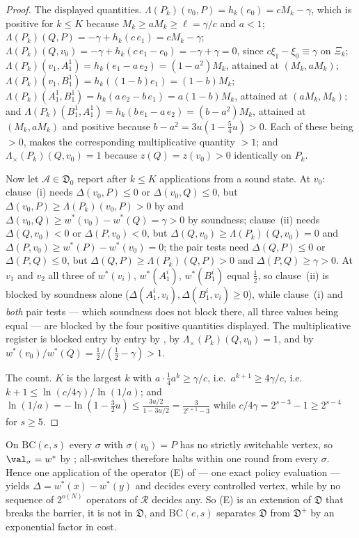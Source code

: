 \begin{proof}
The displayed quantities. $\Lambda(P_k)(v_0,P)=h_k(e_0)=cM_k-\gamma$,
which is positive for $k\le K$ because $M_k\ge aM_k\ge\ell=\gamma/c$ and
$a<1$; $\Lambda(P_k)(Q,P)=-\gamma+h_k(c\,e_1)=cM_k-\gamma$;
$\Lambda(P_k)(Q,v_0)=-\gamma+h_k(c\,e_1-e_0)=-\gamma+\gamma=0$, since
$c\xi_1-\xi_0\equiv\gamma$ on $\Xi_k$;
$\Lambda(P_k)(v_1,A^{1}_1)=h_k(e_1-a\,e_2)=(1-a^{2})M_k$, attained at
$(M_k,aM_k)$; $\Lambda(P_k)(v_1,B^{1}_1)=h_k((1-b)e_1)=(1-b)M_k$;
$\Lambda(P_k)(A^{1}_1,B^{1}_1)=h_k(a\,e_2-b\,e_1)=a(1-b)M_k$, attained at
$(aM_k,M_k)$; and $\Lambda(P_k)(B^{1}_1,A^{1}_1)=h_k(b\,e_1-a\,e_2)
=(b-a^{2})M_k$, attained at $(M_k,aM_k)$ and positive because
$b-a^{2}=3u(1-\tfrac54u)>0$. Each of these being $>0$, 
makes the corresponding multiplicative quantity $>1$; and
$\Lambda_\times(P_k)(Q,v_0)=1$ because $z(Q)=z(v_0)>0$ identically on
$P_k$.

Now let $\mathcal A\in\mathfrak D_0$ report after $k\le K$ applications
from a sound state. At $v_0$: clause~(i) needs $\Delta(v_0,P)\le0$ or
$\Delta(v_0,Q)\le0$, but $\Delta(v_0,P)\ge\Lambda(P_k)(v_0,P)>0$ by
 and $\Delta(v_0,Q)\ge w^\ast(v_0)-w^\ast(Q)=\gamma>0$
by soundness; clause~(ii) needs $\Delta(Q,v_0)<0$ or $\Delta(P,v_0)<0$,
but $\Delta(Q,v_0)\ge\Lambda(P_k)(Q,v_0)=0$ and
$\Delta(P,v_0)\ge w^\ast(P)-w^\ast(v_0)=0$; the pair tests need
$\Delta(Q,P)\le0$ or $\Delta(P,Q)\le0$, but
$\Delta(Q,P)\ge\Lambda(P_k)(Q,P)>0$ and $\Delta(P,Q)\ge\gamma>0$. At
$v_1$ and $v_2$ all three of $w^\ast(v_i)$, $w^\ast(A^{i}_1)$,
$w^\ast(B^{i}_1)$ equal $\tfrac12$, so clause~(ii) is blocked by soundness
alone ($\Delta(A^{i}_1,v_i),\Delta(B^{i}_1,v_i)\ge0$), while clause~(i)
and \emph{both} pair tests --- which soundness does not block there, all
three values being equal --- are blocked by the four positive quantities
displayed. The multiplicative register is blocked entry by entry by
, by $\Lambda_\times(P_k)(Q,v_0)=1$, and by
$w^\ast(v_0)/w^\ast(Q)=\tfrac12/(\tfrac12-\gamma)>1$.

The count. $K$ is the largest $k$ with $a\cdot\tfrac14a^{k}\ge\gamma/c$,
i.e.\ $a^{k+1}\ge4\gamma/c$, i.e.\ $k+1\le\ln(c/4\gamma)/\ln(1/a)$; and
$\ln(1/a)=-\ln(1-\tfrac32u)\le\tfrac{3u/2}{1-3u/2}=\tfrac{3}{2^{e+1}-3}$
while $c/4\gamma=2^{s-3}-1\ge2^{s-4}$ for $s\ge5$.
\end{proof}

\begin{corollary}\label{ob:edge}
On $\mathrm{BC}(e,s)$ every $\sigma$ with $\sigma(v_0)=P$ has no strictly
switchable vertex, so $\val_\sigma=w^\ast$ by ;
all-switches therefore halts within one round from every $\sigma$. Hence
one application of the operator \textup{(E)} of  --- one
exact policy evaluation --- yields $\Delta=w^\ast(x)-w^\ast(y)$ and
decides every controlled vertex, while by  no sequence
of $2^{o(N)}$ operators of $\mathcal R$ decides any. So \textup{(E)} is an
extension of $\mathfrak D$ that breaks the barrier, it is not in
$\mathfrak D$, and $\mathrm{BC}(e,s)$ separates $\mathfrak D$ from
$\mathfrak D^{+}$ by an exponential factor in cost.
\end{corollary}

